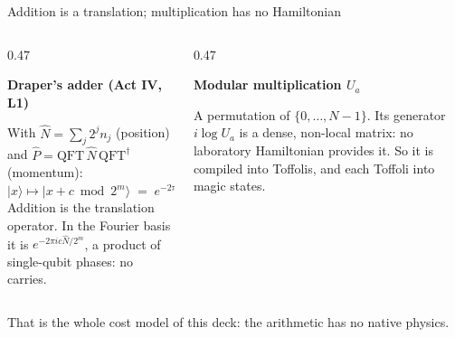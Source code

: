 \documentclass[aspectratio=169,11pt]{beamer}
\newcommand{\ket}[1]{|#1\rangle}
\newcommand{\blocktitle}[1]{{\bfseries #1}\par\vskip1mm}
\newcommand{\peachtitle}[1]{{\bfseries\color{cverm}#1}\par\vskip1mm}
\begin{document}
\begin{frame}{Addition is a translation; multiplication has no Hamiltonian}
  \begin{columns}[T]
    \begin{column}{0.47\textwidth}
      \begin{greyblock}
        \blocktitle{Draper's adder (Act IV, L1)}
        With $\hat N=\sum_j2^jn_j$ (position) and $\hat P=\mathrm{QFT}\,\hat N\,\mathrm{QFT}^\dagger$ (momentum):
        \[ \ket{x}\mapsto\ket{x+c \bmod 2^m}\;=\;e^{-2\pi i\,c\,\hat P/2^m} . \]
        Addition is the translation operator. In the Fourier basis it is $e^{-2\pi ic\hat N/2^m}$, a product of single-qubit phases: no carries.
      \end{greyblock}
    \end{column}
    \begin{column}{0.47\textwidth}
      \begin{peachblock}
        \peachtitle{Modular multiplication $U_a$}
        A permutation of $\{0,\dots,N-1\}$. Its generator $i\log U_a$ is a dense, non-local matrix: no laboratory Hamiltonian provides it.
        \vskip2mm
        So it is compiled into Toffolis, and each Toffoli into magic states.
      \end{peachblock}
    \end{column}
  \end{columns}
  \begin{takeaway}That is the whole cost model of this deck: the arithmetic has no native physics.\end{takeaway}
\end{frame}
\end{document}
